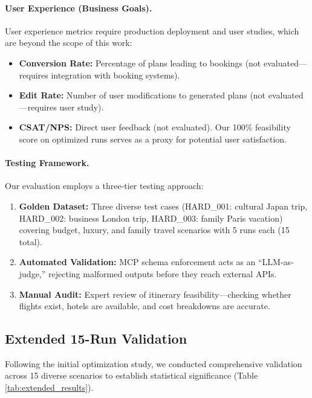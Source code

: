 \documentclass[10pt,twocolumn]{article}
\begin{document}
\paragraph{User Experience (Business Goals).}
User experience metrics require production deployment and user studies, which are beyond the scope of this work:
\begin{itemize}
    \item \textbf{Conversion Rate:} Percentage of plans leading to bookings (not evaluated---requires integration with booking systems).
    \item \textbf{Edit Rate:} Number of user modifications to generated plans (not evaluated---requires user study).
    \item \textbf{CSAT/NPS:} Direct user feedback (not evaluated). Our 100\% feasibility score on optimized runs serves as a proxy for potential user satisfaction.
\end{itemize}

\paragraph{Testing Framework.}
Our evaluation employs a three-tier testing approach:
\begin{enumerate}
    \item \textbf{Golden Dataset:} Three diverse test cases (HARD\_001: cultural Japan trip, HARD\_002: business London trip, HARD\_003: family Paris vacation) covering budget, luxury, and family travel scenarios with 5 runs each (15 total).
    \item \textbf{Automated Validation:} MCP schema enforcement acts as an ``LLM-as-judge,'' rejecting malformed outputs before they reach external APIs.
    \item \textbf{Manual Audit:} Expert review of itinerary feasibility---checking whether flights exist, hotels are available, and cost breakdowns are accurate.
\end{enumerate}

\FloatBarrier
\subsection{Extended 15-Run Validation}
Following the initial optimization study, we conducted comprehensive validation across 15 diverse scenarios to establish statistical significance (Table \ref{tab:extended_results}).
\end{document}
